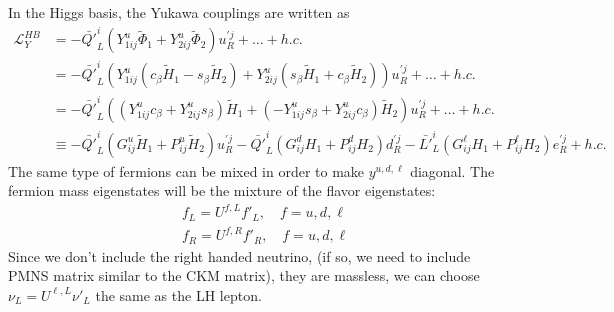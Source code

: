 \documentclass[12pt]{article}
\begin{document}
In the Higgs basis, the Yukawa couplings are written as
\begin{align}
\mathcal{L}_{Y}^{HB} &= - \bar{Q'}_{L}^{i}(Y_{1ij}^{u}\tilde{\Phi}_{1}+Y_{2ij}^{u}\tilde{\Phi}_{2})u_{R}^{'j} + \dots + h.c. \\
&=-\bar{Q'}_{L}^{i}(Y_{1ij}^{u}(c_{\beta}\tilde{H}_{1}-s_{\beta}\tilde{H}_{2})+Y_{2ij}^{u}(s_{\beta}\tilde{H}_{1}+c_{\beta}\tilde{H}_{2}))u_{R}^{'j} + \dots + h.c. \\
&=-\bar{Q'}_{L}^{i}((Y_{1ij}^{u}c_{\beta}+Y_{2ij}^{u}s_{\beta})\tilde{H}_{1}+(-Y_{1ij}^{u}s_{\beta}+Y_{2ij}^{u}c_{\beta})\tilde{H}_{2})u_{R}^{'j} + \dots +h.c.\\
&\equiv -\bar{Q'}_{L}^{i}(G_{ij}^{u}\tilde{H}_{1}+P_{ij}^{u}\tilde{H}_{2})u_{R}^{'j} - \bar{Q'}_{L}^{i}(G_{ij}^{d}H_{1}+P_{ij}^{d}H_{2})d_{R}^{'j} - \bar{L'}_{L}^{i}(G_{ij}^{\ell}H_{1}+P_{ij}^{\ell}H_{2})e_{R}^{'j} + h.c.
\end{align}
The same type of fermions can be mixed in order to make $y^{u,d,\ell}$ diagonal. The fermion mass eigenstates will be the mixture of the flavor eigenstates:
\begin{align}
&f_{L} = U^{f,L}f'_{L},\quad f=u,d,\ell\\
&f_{R} = U^{f,R}f'_{R},\quad f=u,d,\ell
\end{align}
Since we don't include the right handed neutrino, (if so, we need to include PMNS matrix similar to the CKM matrix), they are massless, we can choose $\nu_{L} = U^{\ell,L}\nu'_{L}$ the same as the LH lepton.
\end{document}
